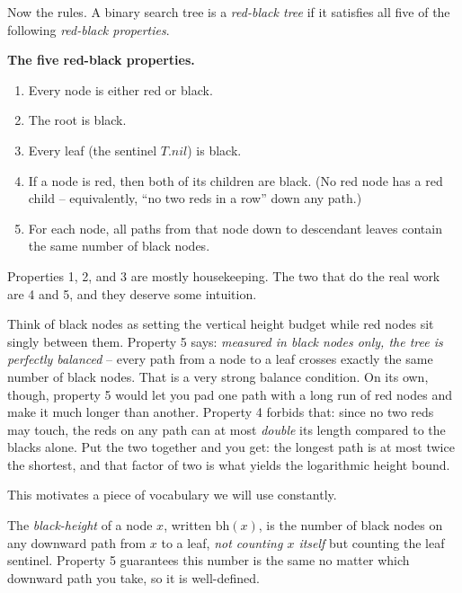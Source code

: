 Now the rules. A binary search tree is a \emph{red-black tree} if it satisfies all
five of the following \emph{red-black properties}.

\begin{formalbox}
\textbf{The five red-black properties.}
\begin{enumerate}
\item Every node is either red or black.
\item The root is black.
\item Every leaf (the sentinel $T.nil$) is black.
\item If a node is red, then both of its children are black. (No red node has a
red child -- equivalently, ``no two reds in a row'' down any path.)
\item For each node, all paths from that node down to descendant leaves
contain the same number of black nodes.
\end{enumerate}
\end{formalbox}

Properties 1, 2, and 3 are mostly housekeeping. The two that do the real work are
4 and 5, and they deserve some intuition.

\begin{intuitionbox}
Think of black nodes as setting the vertical height budget while red nodes
sit singly between them. Property 5 says: \emph{measured in black
nodes only, the tree is perfectly balanced} -- every path from a node to a leaf
crosses exactly the same number of black nodes. That is a very strong balance
condition. On its own, though, property 5 would let you pad one path with a long
run of red nodes and make it much longer than another. Property 4 forbids that:
since no two reds may touch, the reds on any path can at most \emph{double} its
length compared to the blacks alone. Put the two together and you get: the
longest path is at most twice the shortest, and that factor of two is what
yields the logarithmic height bound.
\end{intuitionbox}

This motivates a piece of vocabulary we will use constantly.

\begin{definition}\label{ch13:def-black-height}
The \emph{black-height} of a node $x$, written $\mathrm{bh}(x)$, is the number of
black nodes on any downward path from $x$ to a leaf, \emph{not counting $x$
itself} but counting the leaf sentinel. Property 5 guarantees this number is the
same no matter which downward path you take, so it is well-defined.
\end{definition}

